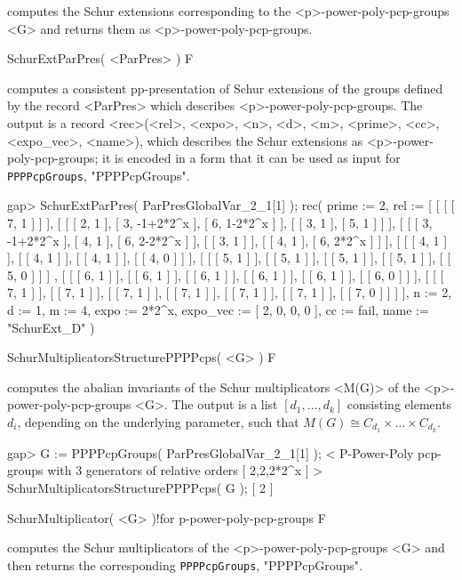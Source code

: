 computes the Schur extensions corresponding to the <p>-power-poly-pcp-groups
<G> and returns them as <p>-power-poly-pcp-groups.

\>SchurExtParPres( <ParPres> ) F

computes a consistent pp-presentation of Schur extensions of the 
groups defined by the record <ParPres> which describes 
<p>-power-poly-pcp-groups. The output is a record 
<rec>(<rel>, <expo>, <n>, <d>, <m>, <prime>, <cc>, <expo\_vec>, <name>), 
which describes the Schur extensions as <p>-power-poly-pcp-groups; it is 
encoded in a form that it can be used as input for 
{\tt PPPPcpGroups},
"PPPPcpGroups".

\beginexample
gap> SchurExtParPres( ParPresGlobalVar_2_1[1] );
rec( prime := 2, 
  rel := [ [ [ [ 7, 1 ] ] ], [ [ [ 2, 1 ], [ 3, -1+2*2^x ], [ 6, 1-2*2^x ] ], 
          [ [ 3, 1 ], [ 5, 1 ] ] ], 
      [ [ [ 3, -1+2*2^x ], [ 4, 1 ], [ 6, 2-2*2^x ] ], [ [ 3, 1 ] ], 
          [ [ 4, 1 ], [ 6, 2*2^x ] ] ], 
      [ [ [ 4, 1 ] ], [ [ 4, 1 ] ], [ [ 4, 1 ] ], [ [ 4, 0 ] ] ], 
      [ [ [ 5, 1 ] ], [ [ 5, 1 ] ], [ [ 5, 1 ] ], [ [ 5, 1 ] ], [ [ 5, 0 ] ] ]
        , 
      [ [ [ 6, 1 ] ], [ [ 6, 1 ] ], [ [ 6, 1 ] ], [ [ 6, 1 ] ], [ [ 6, 1 ] ], 
          [ [ 6, 0 ] ] ], 
      [ [ [ 7, 1 ] ], [ [ 7, 1 ] ], [ [ 7, 1 ] ], [ [ 7, 1 ] ], [ [ 7, 1 ] ], 
          [ [ 7, 1 ] ], [ [ 7, 0 ] ] ] ], n := 2, d := 1, m := 4, 
  expo := 2*2^x, expo_vec := [ 2, 0, 0, 0 ], cc := fail, name := "SchurExt_D" 
 )
\endexample


\>SchurMultiplicatorsStructurePPPPcps( <G> ) F

computes the abalian invariants of the Schur multiplicators <M(G)> of the 
<p>-power-poly-pcp-groups <G>. The output is a list $[d_1, ..., d_k]$ 
consisting elements $d_i$, depending on the underlying parameter, such that 
$M(G) \cong C_{d_1} \times \ldots \times C_{d_k}$.

\beginexample
gap> G := PPPPcpGroups( ParPresGlobalVar_2_1[1] );
< P-Power-Poly pcp-groups with 3 generators of relative orders [ 2,2,2*2^x ] >
SchurMultiplicatorsStructurePPPPcps( G );
[ 2 ]
\endexample

\>SchurMultiplicator( <G> )!{for p-power-poly-pcp-groups} F

computes the Schur multiplicators of the <p>-power-poly-pcp-groups <G> and 
then returns the corresponding 
{\tt PPPPcpGroups},
"PPPPcpGroups".

